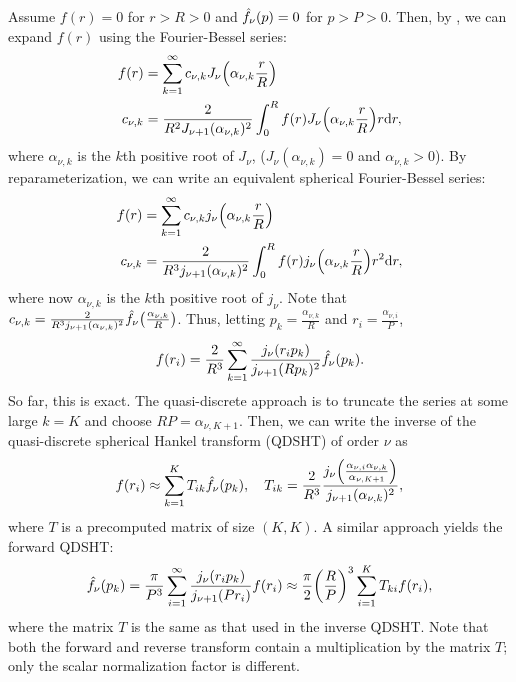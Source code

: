 \documentclass[../../main.tex]{subfiles}
\begin{document}
\begin{refsection}
	Assume $f(r) = 0$ for $r > R > 0$ and $\hat{f}_\nu(p) = 0$ for $p > P > 0$.
	Then, by \cite[Eqs. 11.51 and 11.52]{arfkenMathematicalMethodsPhysicists2005}, we can expand $f(r)$ using the Fourier-Bessel series:
	\begin{align*}
		f(r)      & = \sum_{k=1}^\infty c_{\nu,k} J_{\nu}\qty(\alpha_{\nu,k} \frac{r}{R})                                        \\
		c_{\nu,k} & = \frac{2}{R^2 J_{\nu + 1}(\alpha_{\nu,k})^2} \int_0^R f(r) J_{\nu}\qty(\alpha_{\nu,k} \frac{r}{R}) r \dd r,
	\end{align*}
	where $\alpha_{\nu,k}$ is the $k$th positive root of $J_\nu$, (\ie $J_\nu(\alpha_{\nu,k}) = 0$ and $\alpha_{\nu,k} > 0$).
	By reparameterization, we can write an equivalent spherical Fourier-Bessel series:
	\begin{align*}
		f(r)      & = \sum_{k=1}^\infty c_{\nu,k} j_{\nu}\qty(\alpha_{\nu,k} \frac{r}{R})                                          \\
		c_{\nu,k} & = \frac{2}{R^3 j_{\nu + 1}(\alpha_{\nu,k})^2} \int_0^R f(r) j_{\nu}\qty(\alpha_{\nu,k} \frac{r}{R}) r^2 \dd r,
	\end{align*}
	where now $\alpha_{\nu,k}$ is the $k$th positive root of $j_\nu$.
	Note that $c_{\nu,k} = \frac{2}{R^3 j_{\nu + 1}(\alpha_{\nu,k})^2} \hat{f}_{\nu}\qty(\frac{\alpha_{\nu,k}}{R})$.
	Thus, letting $p_k = \frac{\alpha_{\nu,k}}{R}$ and $r_i = \frac{\alpha_{\nu,i}}{P}$,
	$$f(r_i) = \frac{2}{R^3} \sum_{k=1}^\infty \frac{j_{\nu}\qty(r_i p_k)}{j_{\nu + 1}(R p_k)^2} \hat{f}_{\nu}\qty(p_k).$$
	So far, this is exact.
	The quasi-discrete approach is to truncate the series at some large $k=K$ and choose $R P = \alpha_{\nu, K + 1}$.
	Then, we can write the inverse of the quasi-discrete spherical Hankel transform (QDSHT) of order $\nu$ as
	\begin{equation}\label{qdsht_inverse}
		f(r_i) \approx \sum_{k=1}^K T_{ik} \hat{f}_{\nu}(p_k), \quad T_{ik} = \frac{2}{R^3} \frac{j_{\nu}\qty(\frac{\alpha_{\nu,i} \alpha_{\nu,k}}{\alpha_{\nu,K+1}})}{j_{\nu + 1}(\alpha_{\nu,k})^2},
	\end{equation}
	where $T$ is a precomputed matrix of size $(K, K)$.
	A similar approach yields the forward QDSHT:
	\begin{equation}\label{qdsht}
		\hat{f}_\nu(p_k) = \frac{\pi}{P^3} \sum_{i=1}^\infty \frac{j_\nu(r_i p_k)}{j_{\nu+1}(P r_i)} f(r_i) \approx \frac{\pi}{2} \qty(\frac{R}{P})^3 \sum_{i=1}^K T_{ki} f(r_i),
	\end{equation}
	where the matrix $T$ is the same as that used in the inverse QDSHT.
	Note that both the forward and reverse transform contain a multiplication by the matrix $T$; only the scalar normalization factor is different.


\end{refsection}
\end{document}
